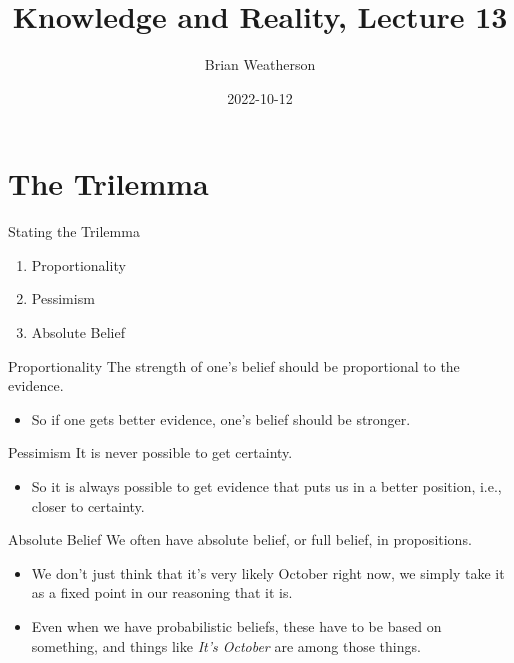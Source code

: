 \documentclass[
  17pt,
  letterpaper,
  ignorenonframetext,
  aspectratio=169,
  handout]{beamer}
\title{Knowledge and Reality, Lecture 13}
\author{Brian Weatherson}
\date{2022-10-12}
\providecommand{\tightlist}{%
  \setlength{\itemsep}{0pt}\setlength{\parskip}{0pt}}\usepackage{longtable,booktabs,array}
\begin{document}
\frame{\titlepage}
\ifdefined\Shaded\renewenvironment{Shaded}{\begin{tcolorbox}[boxrule=0pt, borderline west={3pt}{0pt}{shadecolor}, breakable, enhanced, sharp corners, interior hidden, frame hidden]}{\end{tcolorbox}}\fi

\hypertarget{the-trilemma}{%
\section{The Trilemma}\label{the-trilemma}}

\begin{frame}{Stating the Trilemma}
\protect\hypertarget{stating-the-trilemma}{}
\begin{enumerate}[<+->]
\tightlist
\item
  Proportionality
\item
  Pessimism
\item
  Absolute Belief
\end{enumerate}
\end{frame}

\begin{frame}{Proportionality}
\protect\hypertarget{proportionality}{}
The strength of one's belief should be proportional to the evidence.

\begin{itemize}[<+->]
\tightlist
\item
  So if one gets better evidence, one's belief should be stronger.
\end{itemize}
\end{frame}

\begin{frame}{Pessimism}
\protect\hypertarget{pessimism}{}
It is never possible to get certainty.

\begin{itemize}[<+->]
\tightlist
\item
  So it is always possible to get evidence that puts us in a better
  position, i.e., closer to certainty.
\end{itemize}
\end{frame}

\begin{frame}{Absolute Belief}
\protect\hypertarget{absolute-belief}{}
We often have absolute belief, or full belief, in propositions.

\begin{itemize}[<+->]
\tightlist
\item
  We don't just think that it's very likely October right now, we simply
  take it as a fixed point in our reasoning that it is.
\item
  Even when we have probabilistic beliefs, these have to be based on
  something, and things like \emph{It's October} are among those things.
\end{itemize}
\end{frame}
\end{document}
